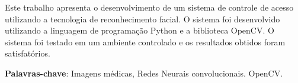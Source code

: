 \begin{resumo}
 \begin{SingleSpace}
  
  \noindent
  Este trabalho apresenta o desenvolvimento de um sistema de controle de acesso utilizando a tecnologia de reconhecimento facial. O sistema foi desenvolvido utilizando a linguagem de programação Python e a biblioteca OpenCV. O sistema foi testado em um ambiente controlado e os resultados obtidos foram satisfatórios.
  
  \vspace{\onelineskip}
 
  \noindent
  \textbf{Palavras-chave}: Imagens médicas, Redes Neurais convolucionais. OpenCV.
 \end{SingleSpace}
\end{resumo}